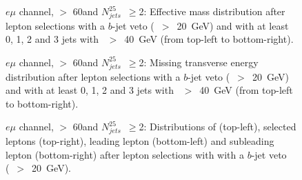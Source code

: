 \begin{figure}[h!]
\centering
{}
\caption{$e\mu$ channel, \met $>$ 60\GeV and $N_{jets}^{25}$~$\ge$2: Effective mass distribution after lepton selections with a $b$-jet veto (\pt~$>$~20~GeV) and with at least 0, 1, 2 and 3 jets with \pt~$>$~40~GeV (from top-left to bottom-right).}
\label{Fig:VP_em_0b_Meff}
\end{figure}
\begin{figure}[h!]
\centering
{}
\caption{$e\mu$ channel, \met $>$ 60\GeV and $N_{jets}^{25}$~$\ge$2: Missing transverse energy distribution after lepton selections with a $b$-jet veto (\pt~$>$~20~GeV) and with at least 0, 1, 2 and 3 jets with \pt~$>$~40~GeV (from top-left to bottom-right).}
\label{Fig:VP_em_0b_Met}
\end{figure} 
\begin{figure}[h!]
\centering
{}
\caption{$e\mu$ channel, \met $>$ 60\GeV and $N_{jets}^{25}$~$\ge$2: Distributions of \mt (top-left), selected leptons \pt (top-right), leading lepton \pt (bottom-left) and subleading lepton \pt (bottom-right) after lepton selections with with a $b$-jet veto (\pt~$>$~20~GeV).}
\label{Fig:VP_em_0b_Njets_and_other}
\end{figure} 

\FloatBarrier


